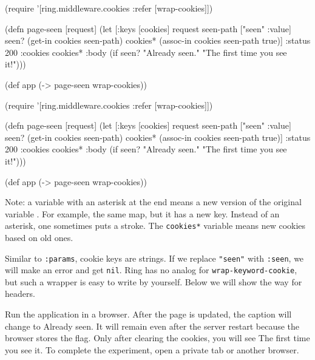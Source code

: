 \ifx\DEVICETYPE\MOBILE

\begin{clojure/lines}
(require '[ring.middleware.cookies
           :refer [wrap-cookies]])

(defn page-seen [request]
  (let [{:keys [cookies]} request
        seen-path ["seen" :value]
        seen? (get-in cookies
                      seen-path)
        cookies* (assoc-in cookies
                   seen-path true)]
    {:status 200
     :cookies cookies*
     :body
     (if seen?
      "Already seen."
      "The first time you see it!")}))

(def app (-> page-seen
             wrap-cookies))
\end{clojure/lines}

\else

\begin{clojure/lines}
(require '[ring.middleware.cookies
           :refer [wrap-cookies]])

(defn page-seen [request]
  (let [{:keys [cookies]} request
        seen-path ["seen" :value]
        seen? (get-in cookies seen-path)
        cookies* (assoc-in cookies seen-path true)]
    {:status 200
     :cookies cookies*
     :body (if seen?
             "Already seen."
             "The first time you see it!")}))

(def app (-> page-seen
             wrap-cookies))
\end{clojure/lines}

\fi

Note: a variable with an asterisk at the end means a new version of the original variable . For example, the same map, but it has a new key. Instead of an asterisk, one sometimes puts a stroke. The \verb|cookies*| variable means new cookies based on old ones.


Similar to \verb|:params|, cookie keys are strings. If we replace \verb|"seen"| with \verb|:seen|, we will make an error and get \verb|nil|. Ring has no analog for \verb|wrap-keyword-cookie|, but such a wrapper is easy to write by yourself. Below we will show the way for headers.

Run the application in a browser. After the page is updated, the caption will change to Already seen. It will remain even after the server restart because the browser stores the flag. Only after clearing the cookies, you will see The first time you see it. To complete the experiment, open a private tab or another browser.


